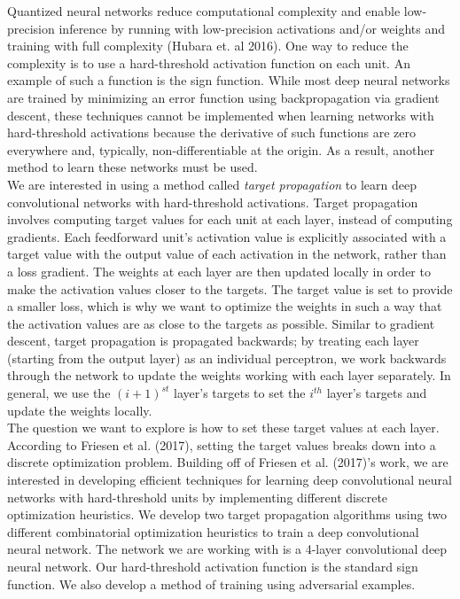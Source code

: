 \documentclass[a4paper]{article}
\begin{document}
Quantized neural networks reduce computational complexity and enable low-precision inference by running with low-precision activations and/or weights and training with full complexity (Hubara et. al 2016). One way to reduce the complexity is to use a hard-threshold activation function on each unit. An example of such a function is the sign function. While most deep neural networks are trained by minimizing an error function using backpropagation via gradient descent, these techniques cannot be implemented when learning networks with hard-threshold activations because the derivative of such functions are zero everywhere and, typically, non-differentiable at the origin. As a result, another method to learn these networks must be used. \\ 

We are interested in using a method called \emph{target propagation} to learn deep convolutional networks with hard-threshold activations. Target propagation involves computing target values for each unit at each layer, instead of computing gradients. Each feedforward unit's activation value is explicitly associated with a target value with the output value of each activation in the network, rather than a loss gradient. The weights at each layer are then updated locally in order to make the activation values closer to the targets. The target value is set to provide a smaller loss, which is why we want to optimize the weights in such a way that the activation values are as close to the targets as possible. Similar to gradient descent, target propagation is propagated backwards; by treating each layer (starting from the output layer) as an individual perceptron, we work backwards through the network to update the weights working with each layer separately. In general, we use the $(i+1)^{st}$ layer's targets to set the $i^{th}$ layer's targets and update the weights locally. \\

The question we want to explore is how to set these target values at each layer. According to Friesen et al. (2017), setting the target values breaks down into a discrete optimization problem. Building off of Friesen et al. (2017)'s work, we are interested in developing efficient techniques for learning deep convolutional neural networks with hard-threshold units by implementing different discrete optimization heuristics. We develop two target propagation algorithms using two different combinatorial optimization heuristics  to train a deep convolutional neural network. The network we are working with is a 4-layer convolutional deep neural network. Our hard-threshold activation function is the standard sign function. We also develop a method of training using adversarial examples. 
\end{document}
